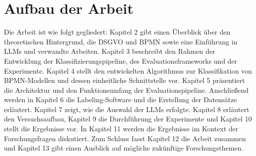 \section{Aufbau der Arbeit}\label{sec:aufbau-der-arbeit}

Die Arbeit ist wie folgt gegliedert: Kapitel 2 gibt einen Überblick über den theoretischen Hintergrund, die \ac{DSGVO} und \ac{BPMN} sowie eine Einführung in \acp{LLM} und verwandte Arbeiten. Kapitel 3 beschreibt den Rahmen der Entwicklung der Klassifizierungspipeline, des Evaluationsframeworks und der Experimente. Kapitel 4 stellt den entwickelten Algorithmus zur Klassifikation von \ac{BPMN}-Modellen und dessen einheitliche Schnittstelle vor. Kapitel 5 präsentiert die Architektur und den Funktionsumfang der Evaluationspipeline. Anschließend werden in Kapitel 6 die Labeling-Software und die Erstellung der Datensätze erläutert. Kapitel 7 zeigt, wie die Auswahl der \acp{LLM} erfolgte. Kapitel 8 erläutert den Versuchsaufbau, Kapitel 9 die Durchführung der Experimente und Kapitel 10 stellt die Ergebnisse vor. In Kapitel 11 werden die Ergebnisse im Kontext der Forschungsfragen diskutiert. Zum Schluss fasst Kapitel 12 die Arbeit zusammen und Kapitel 13 gibt einen Ausblick auf mögliche zukünftige Forschungsthemen.
